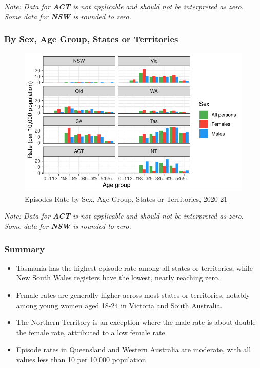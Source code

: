 \documentclass[
  a4paper,
  DIV=11,
  numbers=noendperiod]{scrreport}
\begin{document}
\emph{Note: Data for \textbf{ACT} is not applicable and should not be
interpreted as zero. Some data for \textbf{NSW} is rounded to zero.}

\hypertarget{by-sex-age-group-states-or-territories}{%
\subsubsection{By Sex, Age Group, States or
Territories}\label{by-sex-age-group-states-or-territories}}

\begin{figure}

\caption{\label{fig-rmhc-gsas}Episodes Rate by Sex, Age Group, States or
Territories, 2020-21}

{\centering \includegraphics{./chap4-rmhc_files/figure-pdf/fig-rmhc-gsas-1.pdf}

}

\end{figure}

\emph{Note: Data for \textbf{ACT} is not applicable and should not be
interpreted as zero. Some data for \textbf{NSW} is rounded to zero.}

\hypertarget{summary-8}{%
\subsubsection{Summary}\label{summary-8}}

\begin{itemize}
\item
  Tasmania has the highest episode rate among all states or territories,
  while New South Wales registers have the lowest, nearly reaching zero.
\item
  Female rates are generally higher across most states or territories,
  notably among young women aged 18-24 in Victoria and South Australia.
\item
  The Northern Territory is an exception where the male rate is about
  double the female rate, attributed to a low female rate.
\item
  Episode rates in Queensland and Western Australia are moderate, with
  all values less than 10 per 10,000 population.
\end{itemize}
\end{document}
